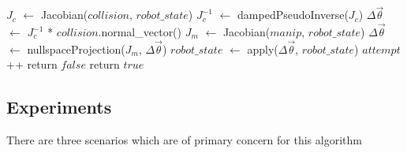 \documentclass[letterpaper, 10 pt, conference]{ieeeconf}  %
\begin{document}
\begin{algorithm}

    \SetLine
     {
         {
            $J_{c}$ $\leftarrow$ Jacobian($collision$, $robot\_state$)\;
            $J_{c}^{-1}$ $\leftarrow$ dampedPseudoInverse($J_{c}$)\;
            $\Delta \vec{\theta}$ $\leftarrow$ $J_{c}^{-1}$ * $collision$.normal\_vector()\;
             {
                 {
                    $J_{m}$ $\leftarrow$ Jacobian($manip$, $robot\_state$)\;
                    $\Delta \vec{\theta}$ $\leftarrow$ nullspaceProjection($J_{m}$, $\Delta \vec{\theta}$)\;
                }
            }
            $robot\_state$ $\leftarrow$ apply($\Delta \vec{\theta}$, $robot\_state$)\;
            $attempt$++\;
             {
                return $false$\;
            }
        }
    }
    return $true$\;

\end{algorithm}

\subsection{Experiments}

There are three scenarios which are of primary concern for this algorithm
\end{document}
